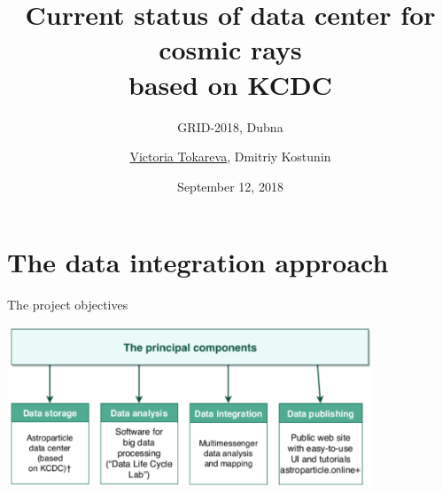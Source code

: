 \documentclass[18pt]{beamer}
\title[Cosmic rays data center]{Current status of data center for cosmic rays \\based on KCDC}
\subtitle{GRID-2018, Dubna}
\author{\underline{Victoria Tokareva}, Dmitriy Kostunin}
\institute{Institute for Nuclear Physics (IKP)}
\date{September 12, 2018}
\begin{document}



\section{The data integration approach}

\begin{frame}{The project objectives}

\vspace{-1.5em}
\begin{center}
\includegraphics[width=0.82\textwidth]{pics/proj_objectives.pdf}
\end{center}

\end{frame}
\end{document}
